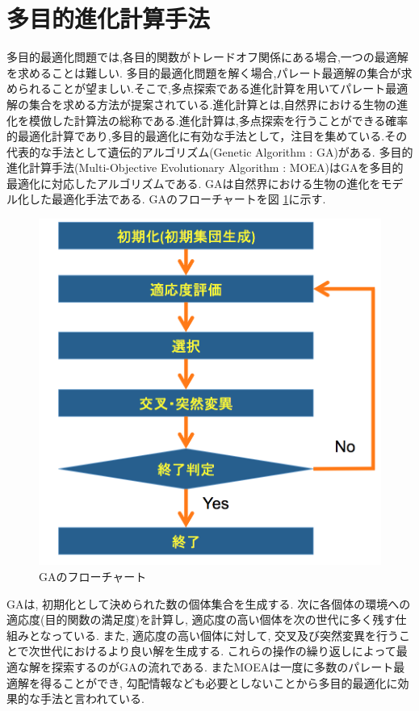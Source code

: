 \documentclass[12pt,a4j,notitlepage]{jreport}
\begin{document}
\section{多目的進化計算手法}
多目的最適化問題では,各目的関数がトレードオフ関係にある場合,一つの最適解を求めることは難しい.
多目的最適化問題を解く場合,パレート最適解の集合が求められることが望ましい.そこで,多点探索である進化計算を用いてパレート最適解の集合を求める方法が提案されている.進化計算とは,自然界における生物の進化を模倣した計算法の総称である.進化計算は,多点探索を行うことができる確率的最適化計算であり,多目的最適化に有効な手法として，注目を集めている.その代表的な手法として遺伝的アルゴリズム(Genetic Algorithm : GA)がある.
多目的進化計算手法(Multi-Objective Evolutionary Algorithm : MOEA)はGAを多目的最適化に対応したアルゴリズムである.
GAは自然界における生物の進化をモデル化した最適化手法である.
GAのフローチャートを図 \ref{fig:GA}に示す.
\begin{figure}[htbp]
	\begin{center}
		\includegraphics[width=0.8\linewidth]{img/GA.png}
             		\setlength{\abovecaptionskip}{0mm}
		\setlength{\belowcaptionskip}{0mm}
			\caption{GAのフローチャート}
	\label{fig:GA}
	\end{center}
\end{figure}

GAは, 初期化として決められた数の個体集合を生成する.
次に各個体の環境への適応度(目的関数の満足度)を計算し, 適応度の高い個体を次の世代に多く残す仕組みとなっている.
また, 適応度の高い個体に対して, 交叉及び突然変異を行うことで次世代におけるより良い解を生成する.
これらの操作の繰り返しによって最適な解を探索するのがGAの流れである.
またMOEAは一度に多数のパレート最適解を得ることができ, 勾配情報なども必要としないことから多目的最適化に効果的な手法と言われている.
\end{document}
